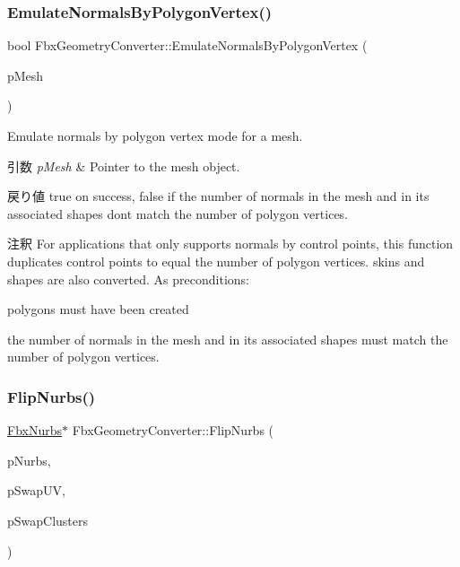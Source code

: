 \subsubsection{\texorpdfstring{Emulate\+Normals\+By\+Polygon\+Vertex()}{EmulateNormalsByPolygonVertex()}}
{\footnotesize\ttfamily bool Fbx\+Geometry\+Converter\+::\+Emulate\+Normals\+By\+Polygon\+Vertex (\begin{DoxyParamCaption}\item[{\hyperlink{class_fbx_mesh}{Fbx\+Mesh} $\ast$}]{p\+Mesh }\end{DoxyParamCaption})}

Emulate normals by polygon vertex mode for a mesh. 
\begin{DoxyParams}{引数}
{\em p\+Mesh} & Pointer to the mesh object. \\
\hline
\end{DoxyParams}
\begin{DoxyReturn}{戻り値}
{\ttfamily true} on success, {\ttfamily false} if the number of normals in the mesh and in its associated shapes don\textquotesingle{}t match the number of polygon vertices. 
\end{DoxyReturn}
\begin{DoxyRemark}{注釈}
For applications that only supports normals by control points, this function duplicates control points to equal the number of polygon vertices. skins and shapes are also converted. As preconditions\+:
\begin{DoxyEnumerate}
\item polygons must have been created
\item the number of normals in the mesh and in its associated shapes must match the number of polygon vertices. 
\end{DoxyEnumerate}
\end{DoxyRemark}
\mbox{\label{class_fbx_geometry_converter_a5b6352d91ef28ac20c8b759496064fa3}} 
\subsubsection{\texorpdfstring{Flip\+Nurbs()}{FlipNurbs()}}
{\footnotesize\ttfamily \hyperlink{class_fbx_nurbs}{Fbx\+Nurbs}$\ast$ Fbx\+Geometry\+Converter\+::\+Flip\+Nurbs (\begin{DoxyParamCaption}\item[{\hyperlink{class_fbx_nurbs}{Fbx\+Nurbs} $\ast$}]{p\+Nurbs,  }\item[{bool}]{p\+Swap\+UV,  }\item[{bool}]{p\+Swap\+Clusters }\end{DoxyParamCaption})}

